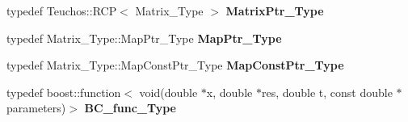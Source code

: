 \begin{DoxyCompactItemize}
\mbox{\label{classFEDD_1_1FE__test_ae3cfa39a166c722fef1c61da95a2051f}} 
typedef Teuchos\+::\+R\+CP$<$ Matrix\+\_\+\+Type $>$ {\bfseries Matrix\+Ptr\+\_\+\+Type}
\item 
\mbox{\label{classFEDD_1_1FE__test_ac3222994604394e705978a046e9e21e4}} 
typedef Matrix\+\_\+\+Type\+::\+Map\+Ptr\+\_\+\+Type {\bfseries Map\+Ptr\+\_\+\+Type}
\item 
\mbox{\label{classFEDD_1_1FE__test_a24e80d214cd4a95668c90970106cc595}} 
typedef Matrix\+\_\+\+Type\+::\+Map\+Const\+Ptr\+\_\+\+Type {\bfseries Map\+Const\+Ptr\+\_\+\+Type}
\item 
\mbox{\label{classFEDD_1_1FE__test_a06a63b4dc1a19562eeb7746ba7688a1b}} 
typedef boost\+::function$<$ void(double $\ast$x, double $\ast$res, double t, const double $\ast$parameters)$>$ {\bfseries B\+C\+\_\+func\+\_\+\+Type}
\end{DoxyCompactItemize}
